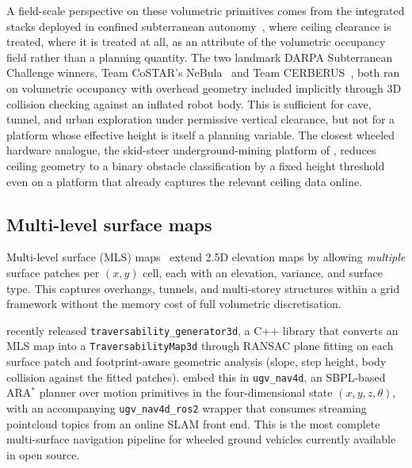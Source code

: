 \documentclass[11pt,a4paper]{article}
\begin{document}
A field-scale perspective on these volumetric primitives comes from the integrated stacks deployed in confined subterranean autonomy~\citep{azpuruaSurveyAutonomousExploration2023}, where ceiling clearance is treated, where it is treated at all, as an attribute of the volumetric occupancy field rather than a planning quantity. The two landmark DARPA Subterranean Challenge winners, Team CoSTAR's NeBula~\citep{aghaNeBulaQuestRobotic2021} and Team CERBERUS~\citep{tranzattoTeamCERBERUSWins2024}, both ran on volumetric occupancy with overhead geometry included implicitly through 3D collision checking against an inflated robot body. This is sufficient for cave, tunnel, and urban exploration under permissive vertical clearance, but not for a platform whose effective height is itself a planning variable. The closest wheeled hardware analogue, the skid-steer underground-mining platform of \citet{tatschRhinoAutonomousRobot2023}, reduces ceiling geometry to a binary obstacle classification by a fixed height threshold even on a platform that already captures the relevant ceiling data online.

\subsection{Multi-level surface maps}
\label{sec:sq1:mls}

Multi-level surface (MLS) maps~\cite{MultiLevelSurfaceMaps} extend 2.5D elevation maps by allowing \emph{multiple} surface patches per $(x,y)$ cell, each with an elevation, variance, and surface type. This captures overhangs, tunnels, and multi-storey structures within a grid framework without the memory cost of full volumetric discretisation.

\citet{lodhiTraversability_generator3dLibrary3D2026} recently released \texttt{traversability\_generator3d}, a C++ library that converts an MLS map into a \texttt{TraversabilityMap3d} through RANSAC plane fitting on each surface patch and footprint-aware geometric analysis (slope, step height, body collision against the fitted patches). \citet{bockmannUgv_nav4dAdvancedMultiSurface2024} embed this in \texttt{ugv\_nav4d}, an SBPL-based ARA$^*$ planner over motion primitives in the four-dimensional state $(x,y,z,\theta)$, with an accompanying \texttt{ugv\_nav4d\_ros2} wrapper that consumes streaming pointcloud topics from an online SLAM front end. This is the most complete multi-surface navigation pipeline for wheeled ground vehicles currently available in open source.
\end{document}
